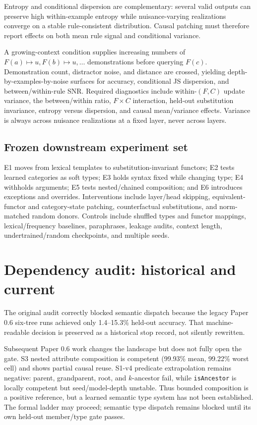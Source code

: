 \documentclass[10pt]{article}
\begin{document}
Entropy and conditional dispersion are complementary: several valid outputs can preserve high within-example entropy while nuisance-varying realizations converge on a stable rule-consistent distribution. Causal patching must therefore report effects on both mean rule signal and conditional variance.

A growing-context condition supplies increasing numbers of $F(a)\mapsto u,F(b)\mapsto u,\ldots$ demonstrations before querying $F(c)$. Demonstration count, distractor noise, and distance are crossed, yielding depth-by-examples-by-noise surfaces for accuracy, conditional JS dispersion, and between/within-rule SNR. Required diagnostics include within-$(F,C)$ update variance, the between/within ratio, $F\times C$ interaction, held-out substitution invariance, entropy versus dispersion, and causal mean/variance effects. Variance is always across nuisance realizations at a fixed layer, never across layers.

\subsection{Frozen downstream experiment set}
E1 moves from lexical templates to substitution-invariant functors; E2 tests learned categories as soft types; E3 holds syntax fixed while changing type; E4 withholds arguments; E5 tests nested/chained composition; and E6 introduces exceptions and overrides. Interventions include layer/head skipping, equivalent-functor and category-state patching, counterfactual substitutions, and norm-matched random donors. Controls include shuffled types and functor mappings, lexical/frequency baselines, paraphrases, leakage audits, context length, undertrained/random checkpoints, and multiple seeds.

\section{Dependency audit: historical and current}
The original audit correctly blocked semantic dispatch because the legacy Paper 0.6 six-tree runs achieved only 1.4--15.3\% held-out accuracy. That machine-readable decision is preserved as a historical stop record, not silently rewritten.

Subsequent Paper 0.6 work changes the landscape but does not fully open the gate. S3 nested attribute composition is competent (99.93\% mean, 99.22\% worst cell) and shows partial causal reuse. S1-v4 predicate extrapolation remains negative: parent, grandparent, root, and $k$-ancestor fail, while \texttt{isAncestor} is locally competent but seed/model-depth unstable. Thus bounded composition is a positive reference, but a learned semantic type system has not been established. The formal ladder may proceed; semantic type dispatch remains blocked until its own held-out member/type gate passes.
\end{document}
